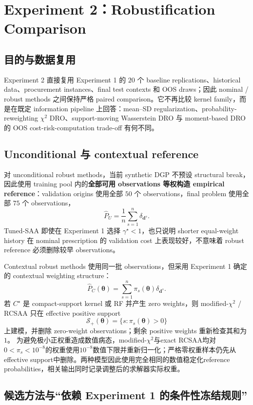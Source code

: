 \documentclass[11pt,a4paper]{ctexart}
\newcommand{\Sset}{\mathcal S}
\begin{document}
\section{Experiment 2：Robustification Comparison}

\subsection{目的与数据复用}

Experiment 2 直接复用 Experiment 1 的 $20$ 个 baseline replications、historical data、procurement instances、final test contexts 和 OOS draws；因此 nominal / robust methods 之间保持严格 paired comparison。它不再比较 kernel family，而是在既定 information pipeline 上回答：mean--SD regularization、probability-reweighting $\chi^2$ DRO、support-moving Wasserstein DRO 与 moment-based DRO 的 OOS cost-risk-computation trade-off 有何不同。

\subsection{Unconditional 与 contextual reference}

对 unconditional robust methods，当前 synthetic DGP 不预设 structural break，因此使用 training pool 内的\textbf{全部可用 observations 等权构造 empirical reference}：validation origins 使用全部 $50$ 个 observations，final problem 使用全部 $75$ 个 observations，
\[
\widehat P_U=\frac1n\sum_{s=1}^n\delta_{\boldsymbol d^s}.
\]
Tuned-SAA 即使在 Experiment 1 选择 $\gamma^\star<1$，也只说明 shorter equal-weight history 在 nominal prescription 的 validation cost 上表现较好，不意味着 robust reference 必须删除较早 observations。

Contextual robust methods 使用同一批 observations，但采用 Experiment 1 确定的 contextual weighting structure：
\[
\widehat P_C(\boldsymbol\theta)=\sum_{s=1}^n\pi_s(\boldsymbol\theta)\delta_{\boldsymbol d^s}.
\]
若 $C^\star$ 是 compact-support kernel 或 RF 并产生 zero weights，则 modified-$\chi^2$ / RCSAA 只在 effective positive support
\[
\Sset_+(\boldsymbol\theta)=\{s:\pi_s(\boldsymbol\theta)>0\}
\]
上建模，并删除 zero-weight observations；剩余 positive weights 重新检查其和为 $1$。
为避免极小正权重造成数值病态，modified-$\chi^2$与exact RCSAA均对$0<\pi_s<10^{-8}$的权重使用$10^{-8}$数值下限并重新归一化；严格零权重样本仍先从effective support中删除。两种模型因此使用完全相同的数值稳定化reference probabilities，相关输出同时记录调整后的求解器实际权重。

\subsection{候选方法与“依赖 Experiment 1 的条件性冻结规则”}
\end{document}
